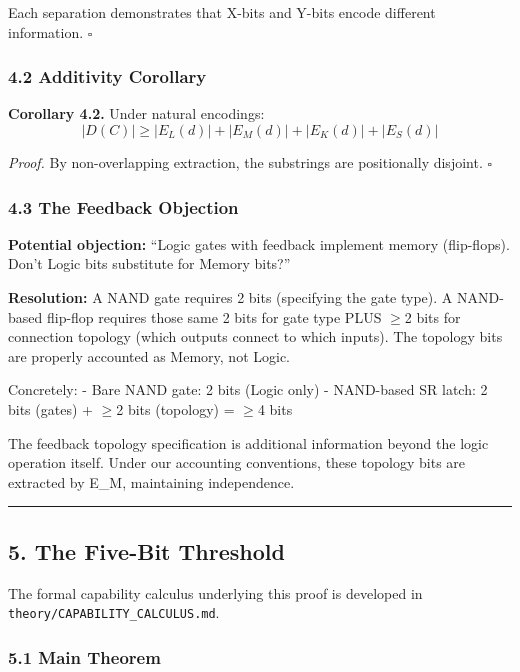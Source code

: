 \documentclass[
  11pt,
]{article}
\begin{document}
Each separation demonstrates that X-bits and Y-bits encode different
information. $\square$

\hypertarget{additivity-corollary}{%
\subsubsection{4.2 Additivity Corollary}\label{additivity-corollary}}

\textbf{Corollary 4.2.} Under natural encodings:
\[|D(C)| \geq |E_L(d)| + |E_M(d)| + |E_K(d)| + |E_S(d)|\]

\emph{Proof.} By non-overlapping extraction, the substrings are
positionally disjoint. $\square$

\hypertarget{the-feedback-objection}{%
\subsubsection{4.3 The Feedback
Objection}\label{the-feedback-objection}}

\textbf{Potential objection:} ``Logic gates with feedback implement
memory (flip-flops). Don't Logic bits substitute for Memory bits?''

\textbf{Resolution:} A NAND gate requires 2 bits (specifying the gate
type). A NAND-based flip-flop requires those same 2 bits for gate type
PLUS $\geq$2 bits for connection topology (which outputs connect to which
inputs). The topology bits are properly accounted as Memory, not Logic.

Concretely: - Bare NAND gate: 2 bits (Logic only) - NAND-based SR latch:
2 bits (gates) + $\geq$2 bits (topology) = $\geq$4 bits

The feedback topology specification is additional information beyond the
logic operation itself. Under our accounting conventions, these topology
bits are extracted by E\_M, maintaining independence.

\begin{center}\rule{0.5\linewidth}{0.5pt}\end{center}

\hypertarget{the-five-bit-threshold}{%
\subsection{5. The Five-Bit Threshold}\label{the-five-bit-threshold}}

The formal capability calculus underlying this proof is developed in
\texttt{theory/CAPABILITY\_CALCULUS.md}.

\hypertarget{main-theorem}{%
\subsubsection{5.1 Main Theorem}\label{main-theorem}}
\end{document}
